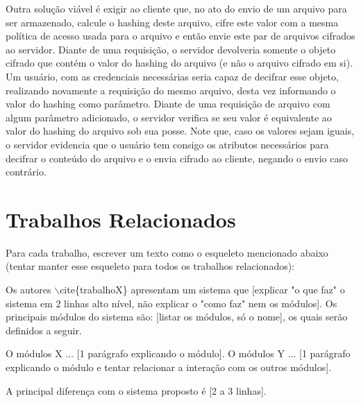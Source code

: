 \documentclass[a4paper,11pt]{article}
\begin{document}
Outra solução viável é exigir ao cliente que, no ato do envio de um arquivo para ser armazenado, calcule o hashing deste arquivo, cifre este valor com a mesma política de acesso usada para o arquivo e então envie este par de arquivos cifrados ao servidor.
Diante de uma requisição, o servidor devolveria somente o objeto cifrado que contém o valor do hashing do arquivo (e não o arquivo cifrado em si).
Um usuário, com as credenciais necessárias seria capaz de decifrar esse objeto, realizando novamente a requisição do mesmo arquivo, desta vez informando o valor do hashing como parâmetro.
Diante de uma requisição de arquivo com algum parâmetro adicionado, o servidor verifica se seu valor é equivalente ao valor do hashing do arquivo sob sua posse. Note que, caso os valores sejam iguais, o servidor evidencia que o usuário tem consigo os atributos necessários para decifrar o conteúdo do arquivo e o envia cifrado ao cliente, negando o envio caso contrário.

\newpage
\section{Trabalhos Relacionados}

{\color{ForestGreen} Para cada trabalho, escrever um texto como o esqueleto mencionado abaixo (tentar manter esse esqueleto para todos os trabalhos relacionados):

Os autores  $\backslash$cite\{trabalhoX\} apresentam um sistema que [explicar "o que faz" o sistema em 2 linhas alto nível, não explicar o "como faz" nem os módulos]. Os principais módulos do sistema são: [listar os módulos, só o nome], os quais serão definidos a seguir.

O módulos X ... [1 parágrafo explicando o módulo].
O módulos Y ... [1  parágrafo explicando o módulo e tentar relacionar a interação com os outros módulos].

A principal diferença com o sistema proposto é [2 a 3 linhas].}
\end{document}
